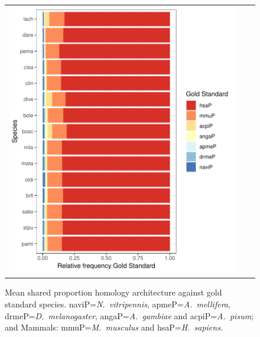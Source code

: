 \documentclass[11pt]{article}
\begin{document}
\begin{figure}
  \begin{tabular}{lcr}
    \begin{minipage}{0.6\textwidth}
    \centering
    \includegraphics[scale=0.7]{figures/proportionsGOLD}
    \end{minipage}
    & \qquad &
    \begin{minipage}{0.35\textwidth}
    \caption{Mean shared proportion homology architecture against 
      gold standard species. \textsf{naviP=}\textit{N.\ vitripennis}, 
      \textsf{apmeP=}\textit{A.\ mellifera}, \textsf{drmeP=}\textit{D.\ melanogaster}, 
      \textsf{angaP=}\textit{A.\ gambiae} and \textsf{acpiP=}\textit{A.\ pisum}; 
      and Mammals: \textsf{mmuP=}\textit{M.\ musculus} and 
    \textsf{hsaP=}\textit{H.\ sapiens}.}\label{fig:FrecEstrat}
    \end{minipage}
  \end{tabular}
\end{figure}
\end{document}
